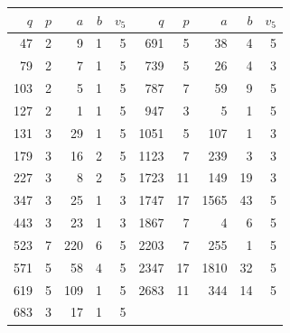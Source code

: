 \begin{center}\small
\begin{tabular}{rrrrr@{\qquad}rrrrr}
\toprule
$q$ & $p$ & $a$ & $b$ & $v_5$ & $q$ & $p$ & $a$ & $b$ & $v_5$\\
\midrule
47 & 2 & 9 & 1 & 5 & 691 & 5 & 38 & 4 & 5\\
79 & 2 & 7 & 1 & 5 & 739 & 5 & 26 & 4 & 3\\
103 & 2 & 5 & 1 & 5 & 787 & 7 & 59 & 9 & 5\\
127 & 2 & 1 & 1 & 5 & 947 & 3 & 5 & 1 & 5\\
131 & 3 & 29 & 1 & 5 & 1051 & 5 & 107 & 1 & 3\\
179 & 3 & 16 & 2 & 5 & 1123 & 7 & 239 & 3 & 3\\
227 & 3 & 8 & 2 & 5 & 1723 & 11 & 149 & 19 & 3\\
347 & 3 & 25 & 1 & 3 & 1747 & 17 & 1565 & 43 & 5\\
443 & 3 & 23 & 1 & 3 & 1867 & 7 & 4 & 6 & 5\\
523 & 7 & 220 & 6 & 5 & 2203 & 7 & 255 & 1 & 5\\
571 & 5 & 58 & 4 & 5 & 2347 & 17 & 1810 & 32 & 5\\
619 & 5 & 109 & 1 & 5 & 2683 & 11 & 344 & 14 & 5\\
683 & 3 & 17 & 1 & 5 &  & & & & \\
\bottomrule\end{tabular}
\end{center}
